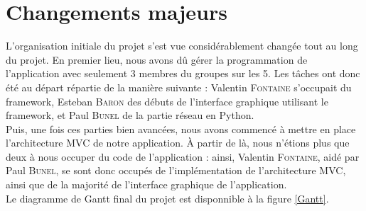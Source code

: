 \documentclass[twoside]{report}
\begin{document}
\section{Changements majeurs}
L'organisation initiale du projet s'est vue considérablement changée tout au long du projet. En premier lieu, nous avons dû gérer la programmation de l'application avec seulement 3 membres du groupes sur les 5. Les tâches ont donc été au départ répartie de la manière suivante : Valentin \textsc{Fontaine} s'occupait du framework, Esteban \textsc{Baron} des débuts de l'interface graphique utilisant le framework, et Paul \textsc{Bunel} de la partie réseau en Python. \\
Puis, une fois ces parties bien avancées, nous avons commencé à mettre en place l'architecture MVC de notre application. À partir de là, nous n'étions plus que deux à nous occuper du code de l'application : ainsi, Valentin \textsc{Fontaine}, aidé par Paul \textsc{Bunel}, se sont donc occupés de l'implémentation de l'architecture MVC, ainsi que de la majorité de l'interface graphique de l'application. \\
Le diagramme de Gantt final du projet est disponnible à la figure \ref{Gantt}.
\end{document}
